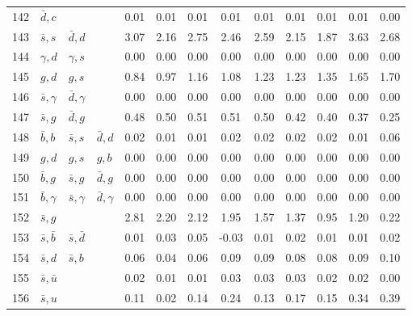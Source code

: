 \begin{tabularx}{\textwidth}{rXXX@{}S@{}S@{}S@{}S@{}S@{}S@{}S@{}S@{}S}
142 & $\bar d, c$      &                   &                  &  0.01 &  0.01 &  0.01 &  0.01 &  0.01 &  0.01 &  0.01 &  0.01 &  0.00 \\
143 & $\bar s, s$      & $\bar d, d$       &                  &  3.07 &  2.16 &  2.75 &  2.46 &  2.59 &  2.15 &  1.87 &  3.63 &  2.68 \\
144 & $\gamma, d$      & $\gamma, s$       &                  &  0.00 &  0.00 &  0.00 &  0.00 &  0.00 &  0.00 &  0.00 &  0.00 &  0.00 \\
145 & $g, d$           & $g, s$            &                  &  0.84 &  0.97 &  1.16 &  1.08 &  1.23 &  1.23 &  1.35 &  1.65 &  1.70 \\
146 & $\bar s, \gamma$ & $\bar d, \gamma$  &                  &  0.00 &  0.00 &  0.00 &  0.00 &  0.00 &  0.00 &  0.00 &  0.00 &  0.00 \\
147 & $\bar s, g$      & $\bar d, g$       &                  &  0.48 &  0.50 &  0.51 &  0.51 &  0.50 &  0.42 &  0.40 &  0.37 &  0.25 \\
148 & $\bar b,  b$     & $\bar s, s$       & $\bar d, d$      &  0.02 &  0.01 &  0.01 &  0.02 &  0.02 &  0.02 &  0.02 &  0.01 &  0.06 \\
149 & $g,  d$          & $g, s$            & $g, b$           &  0.00 &  0.00 &  0.00 &  0.00 &  0.00 &  0.00 &  0.00 &  0.00 &  0.00 \\
150 & $\bar b, g$      & $\bar s, g$       & $\bar d, g$      &  0.00 &  0.00 &  0.00 &  0.00 &  0.00 &  0.00 &  0.00 &  0.00 &  0.00 \\
151 & $\bar b, \gamma$ & $\bar s, \gamma$  & $\bar d, \gamma$ &  0.00 &  0.00 &  0.00 &  0.00 &  0.00 &  0.00 &  0.00 &  0.00 &  0.00 \\
152 & $\bar s, g$      &                   &                  &  2.81 &  2.20 &  2.12 &  1.95 &  1.57 &  1.37 &  0.95 &  1.20 &  0.22 \\
153 & $\bar s, \bar b$ & $\bar s, \bar d$  &                  &  0.01 &  0.03 &  0.05 & -0.03 &  0.01 &  0.02 &  0.01 &  0.01 &  0.02 \\
154 & $\bar s, d$      & $\bar s, b$       &                  &  0.06 &  0.04 &  0.06 &  0.09 &  0.09 &  0.08 &  0.08 &  0.09 &  0.10 \\
155 & $\bar s, \bar u$ &                   &                  &  0.02 &  0.01 &  0.01 &  0.03 &  0.03 &  0.03 &  0.02 &  0.02 &  0.00 \\
156 & $\bar s, u$      &                   &                  &  0.11 &  0.02 &  0.14 &  0.24 &  0.13 &  0.17 &  0.15 &  0.34 &  0.39 \\

\end{tabularx}

